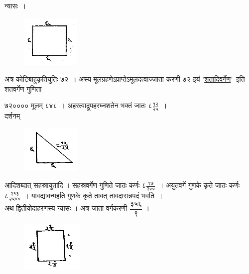 \documentclass[11pt, openany]{book}
\begin{document}
 न्यासः~। 
\vspace{-2mm}

\begin{figure}[h!]
    \centering
    \includegraphics[scale=0.8]{graphics/capture30.png}
\end{figure}
\vspace{-2mm}

 अत्र कोटिबाहुकृतियुतिः ७२~। अस्य मूलग्रहणेऽप्राप्तेऽमूलदत्वाज्जाता करणी ७२ इयं '\hyperref[4.31]{शतादिवर्गेण}'\textendash\ इति शतवर्गेण गुणिता 

\newpage%
\noindent ७२०००० मूलम् ८४८~। अहरत्वाद्रूपहरघ्नशतेन भक्तं जातः 
$\mbox{८}\frac{\mbox{१२}}{\mbox{२५}}$~। \\

\vspace{-4mm}
दर्शनम्
\begin{figure}[h!]
    \centering
    \includegraphics[scale=0.85]{graphics/capture31.png}
\end{figure}

आदिशब्दात्\; सहस्रायुतादि । सहस्रवर्गेण\; गुणिते जातः कर्णः\; $\mbox{८}\frac{\mbox{९७}}{\mbox{२००}}$~। अयुतवर्गे गुणके कृते जातः कर्णः $\mbox{८}\frac{\mbox{२१३}}{\mbox{२५००}}$~। यावद्यावन्महति गुणके कृते तावत् तावदासन्नपदं भवति~।\\

\vspace{-2mm}
 अथ द्वितीयोदाहरणस्य न्यासः । अत्र जाता वर्गकरणी $\dfrac{\mbox{३५६}}{\mbox{९}}$ ।
\begin{figure}[h!]
    \centering
    \includegraphics[scale=0.85]{graphics/capture32.png}
\end{figure}
\end{document}
